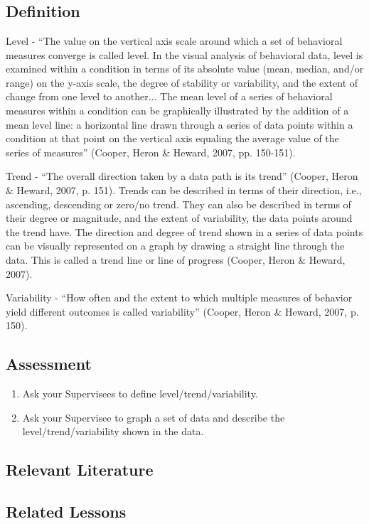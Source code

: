 \clearpage \section[\fourhFour{}]{\fourhFour{}%
              }
\subsection{Definition}
Level - ``The value on the vertical axis scale around which a set of behavioral measures converge is called level. In the visual analysis of behavioral data, level is examined within a condition in terms of its absolute value (mean, median, and/or range) on the y-axis scale, the degree of stability or variability, and the extent of change from one level to another... The mean level of a series of behavioral measures within a condition can be graphically illustrated by the addition of a mean level line: a horizontal line drawn through a series of data points within a condition at that point on the vertical axis equaling the average value of the series of measures'' (Cooper, Heron \& Heward, 2007, pp. 150-151). 

Trend - ``The overall direction taken by a data path is its trend'' (Cooper, Heron \& Heward, 2007, p. 151). Trends can be described in terms of their direction, i.e., ascending, descending or zero/no trend. They can also be described in terms of their degree or magnitude, and the extent of variability, the data points around the trend have. The direction and degree of trend shown in a series of data points can be visually represented on a graph by drawing a straight line through the data. This is called a trend line or line of progress (Cooper, Heron \& Heward, 2007).

Variability - ``How often and the extent to which multiple measures of behavior yield different outcomes is called variability'' (Cooper, Heron \& Heward, 2007, p. 150).
%
\subsection{Assessment}
\begin{enumerate}
\item Ask your Supervisees to define level/trend/variability.
\item Ask your Supervisee to graph a set of data and describe the level/trend/variability shown in the data.
\end{enumerate}
%
\subsection{Relevant Literature}
\begin{refsection}
\nocite{cooper2007applied,
        keohane2005teachers,
        lindsley1985quantified,
        mccain1979statistical,
        white2005trend}
\printbibliography[heading=none]
\end{refsection}
%
\subsection{Related Lessons}
\fouraTen{}\\
\fouraEleven{}\\
\fourhThree{}\\
\fourhFour{}\\
\fouriOne{}\\
\fouriFive{}\\
\fourFKFourtySeven{}\\%
